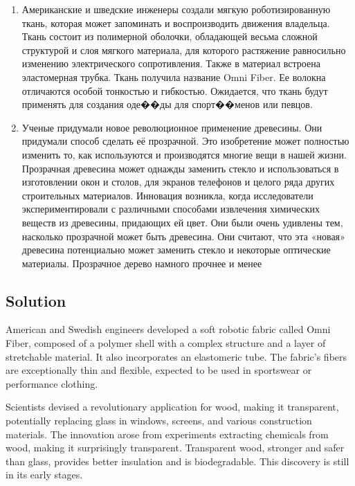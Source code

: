 \begin{enumerate}
      \item Американские и шведские инженеры создали мягкую роботизированную ткань, которая
            может запоминать и воспроизводить движения владельца. Ткань состоит из полимерной
            оболочки, обладающей весьма сложной структурой и слоя мягкого материала, для которого
            растяжение равносильно изменению электрического сопротивления. Также в материал
            встроена эластомерная трубка. Ткань получила название Omni Fiber. Ее волокна отличаются
            особой тонкостью и гибкостью. Ожидается, что ткань будут применять для создания оде��ды
            для спорт��менов или певцов.

      \item Ученые придумали новое революционное применение древесины. Они придумали способ
            сделать её прозрачной. Это изобретение может полностью изменить то, как используются и
            производятся многие вещи в нашей жизни. Прозрачная древесина может однажды заменить
            стекло и использоваться в изготовлении окон и столов, для экранов телефонов и целого ряда
            других строительных материалов. Инновация возникла, когда исследователи
            экспериментировали с различными способами извлечения химических веществ из
            древесины, придающих ей цвет. Они были очень удивлены тем, насколько прозрачной может
            быть древесина. Они считают, что эта «новая» древесина потенциально может заменить
            стекло и некоторые оптические материалы. Прозрачное дерево намного прочнее и менее
\end{enumerate}

\subsection*{Solution}
American and Swedish engineers developed a soft robotic fabric called Omni Fiber, composed of a polymer shell with a complex structure and a layer of stretchable material. It also incorporates an elastomeric tube. The fabric's fibers are exceptionally thin and flexible, expected to be used in sportswear or performance clothing.

Scientists devised a revolutionary application for wood, making it transparent, potentially replacing glass in windows, screens, and various construction materials. The innovation arose from experiments extracting chemicals from wood, making it surprisingly transparent. Transparent wood, stronger and safer than glass, provides better insulation and is biodegradable. This discovery is still in its early stages.

